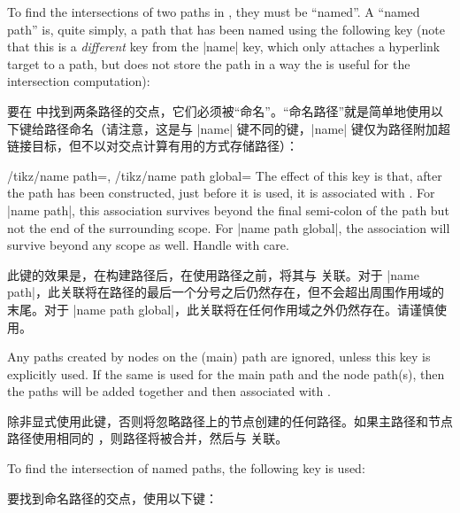 To find the intersections of two paths in \tikzname, they must be ``named''. A
``named path'' is, quite simply, a path that has been named using the following
key (note that this is a \emph{different} key from the |name| key, which only
attaches a hyperlink target to a path, but does not store the path in a way the
is useful for the intersection computation):

要在 \tikzname 中找到两条路径的交点，它们必须被“命名”。“命名路径”就是简单地使用以下键给路径命名（请注意，这是与 |name| 键不同的键，|name| 键仅为路径附加超链接目标，但不以对交点计算有用的方式存储路径）：

\begin{keylist}{%
    /tikz/name path=,
    /tikz/name path global=%
}
    The effect of this key is that, after the path has been constructed, just
    before it is used, it is associated with . For |name path|, this
    association survives beyond the final semi-colon of the path but not the
    end of the surrounding scope. For |name path global|, the association will
    survive beyond any scope as well. Handle with care.

    此键的效果是，在构建路径后，在使用路径之前，将其与  关联。对于 |name path|，此关联将在路径的最后一个分号之后仍然存在，但不会超出周围作用域的末尾。对于 |name path global|，此关联将在任何作用域之外仍然存在。请谨慎使用。

    Any paths created by nodes on the (main) path are ignored, unless this key
    is explicitly used. If the same  is used for the main path and
    the node path(s), then the paths will be added together and then associated
    with .

    除非显式使用此键，否则将忽略路径上的节点创建的任何路径。如果主路径和节点路径使用相同的 ，则路径将被合并，然后与  关联。
\end{keylist}

To find the intersection of named paths, the following key is used:

要找到命名路径的交点，使用以下键：

